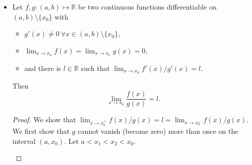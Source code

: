 \documentclass{article}
\newcommand{\R}{\mathbb{R}}
\newcommand{\?}{\stackrel{?}{=}}
\newcommand{\smallblacksquare}{\rule{0.5em}{0.5em}}
\theoremstyle{definition} %
\begin{document}
\begin{itemize}
\begin{proof}
\begin{align*}
            \iff \frac{f'(c)}{g'(c)} &= \frac{f(b) - f(a)}{g(b) - g(a)}.
        \end{align*}
    \end{proof}
    \item[]
    \begin{proposition}
        Let $f, g: (a, b) \mapsto \R$ be two continuous functions differentiable on $(a, b) \setminus \{x_0\}$ with
        \begin{itemize}[label=\smallblacksquare]
            \item $g'(x) \neq 0 \ \forall x \in (a, b) \setminus\{x_0\}$,
            \item $\lim_{x \to x_0} f(x) = \lim_{x \to x_0} g(x) = 0$,
            \item and there is $l \in \R$ such that $\lim_{x \to x_0} f'(x)/g'(x) = l$.
        \end{itemize}
        Then
        $$\lim_{x \to x_0} \frac{f(x)}{g(x)} = l.$$
    \end{proposition}
    \begin{proof}
        We show that $\lim_{x \to x_0^+} f(x)/g(x) = l = \lim_{x \to x_0^-} f(x)/g(x)$. We first show that $g$ cannot vanish (become zero) more than once on the interval $(a, x_0)$. Let $a < x_1 < x_2 < x_0$.
        \begin{center}
\end{center}
\end{proof}
\end{itemize}
\end{document}
